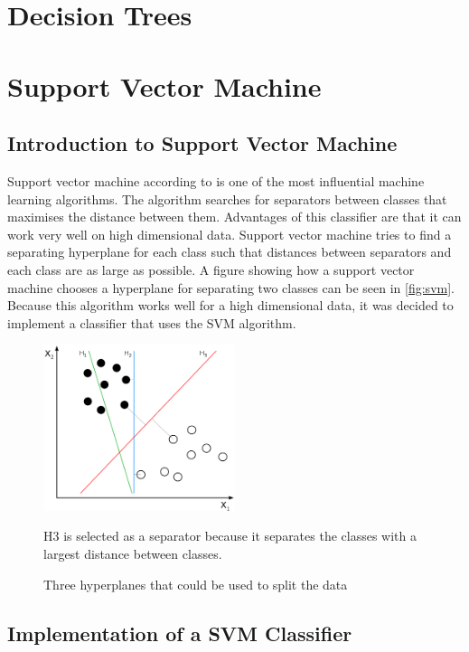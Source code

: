 \section{Decision Trees}

\fi

\section{Support Vector Machine}

\subsection{Introduction to Support Vector Machine}

Support vector machine according to  \cite{boser1992training} is one of the most influential machine learning algorithms. The algorithm searches for separators between classes that maximises the distance between them. Advantages of this classifier are that it can work very well on high dimensional data. Support vector machine tries to find a separating hyperplane for each class such that distances between separators and each class are as large as possible. A figure showing how a support vector machine chooses a hyperplane for separating two classes can be seen in \autoref{fig:svm}. Because this algorithm works well for a high dimensional data, it was decided to implement a classifier that uses the SVM algorithm.

\begin{figure}[h]
\centering
\includegraphics[width=0.5\textwidth]{Figures/svm.PNG}
\caption{Three hyperplanes  that could be used to split the data  }
H3 is selected as a separator because it separates the classes with a largest distance between classes.
\citep{wikipedia_svm}
\label{fig:svm}
\end{figure}


\subsection{Implementation of a SVM Classifier}

